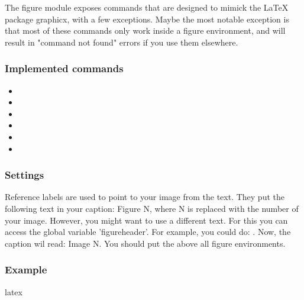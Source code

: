 \begin{paragraph}
    The figure module exposes commands that are designed to mimick the LaTeX package graphicx, with a few exceptions. 
    Maybe the most notable exception is that most of these commands only work inside a figure environment, and will result in "command not found" errors if you use them elsewhere.
\end{paragraph}

\subsubsection{Implemented commands}
\begin{itemize}
    \item{}
    \item{}
    \item{}
    \item{}
    \item{}
    \item{}
\end{itemize}

\subsubsection{Settings}
\begin{paragraph}
    Reference labels are used to point to your image from the text. They put the following text in your caption: Figure N, where N is replaced with the number of your image. However, you might want to use a different text. For this you can access the global variable 'figureheader'. For example, you could do: . Now, the caption wil read: Image N. You should put the  above all figure environments.
\end{paragraph}

\subsubsection{Example}
\begin{code}{latex}
\end{code}

